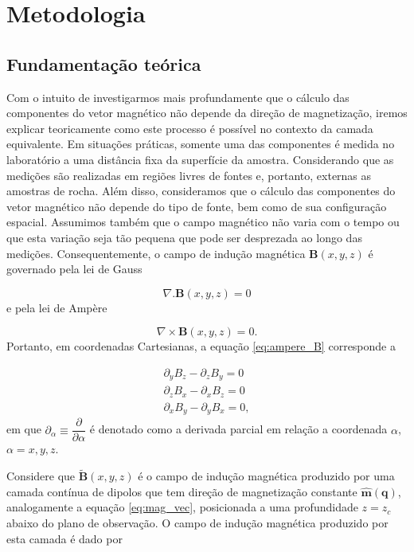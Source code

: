 \chapter{Metodologia}
\label{chap:metodolodia_part2}

\section{Fundamentação teórica}

Com o intuito de investigarmos mais profundamente que o cálculo das componentes do vetor magnético não depende da direção de magnetização, iremos explicar teoricamente como este processo é possível no contexto da camada equivalente. Em situações práticas, somente uma das componentes é medida no laboratório a uma distância fixa da superfície da amostra. Considerando que as medições são realizadas em regiões livres de fontes e, portanto, externas as amostras de rocha. Além disso, consideramos que o cálculo das componentes do vetor magnético não depende do tipo de fonte, bem como de sua configuração espacial. Assumimos também que o campo magnético não varia com o tempo ou que esta variação seja tão pequena que pode ser desprezada ao longo das medições. Consequentemente, o campo de indução magnética $\mathbf{B}(x,y,z)$ é governado pela lei de Gauss

\begin{equation}
\nabla . \mathbf{B} (x,y,z) = 0
\label{eq:gauss_B}
\end{equation}
e pela lei de Ampère 

\begin{equation}
\nabla \times \mathbf{B} (x,y,z) = 0.
\label{eq:ampere_B}
\end{equation}
Portanto, em coordenadas Cartesianas, a equação \ref{eq:ampere_B} corresponde a 

\begin{equation}
\begin{split}
\partial_y B_z - \partial_z B_y = 0 \\
\partial_z B_x - \partial_x B_z = 0 \\
\partial_x B_y - \partial_y B_x = 0, 
\end{split}
\label{eq:ampere_B_condicao}
\end{equation}
em que $\partial_\alpha \equiv \dfrac{\partial}{\partial \alpha}$ é denotado como a derivada parcial em relação a coordenada $\alpha$, $\alpha=x,y,z$. 

Considere que $\tilde{\mathbf{B}}(x,y,z)$ é o campo de indução magnética produzido por uma camada contínua de dipolos que tem direção de magnetização constante $\hat{\mathbf{m}} (\mathbf{q})$, analogamente a equação \ref{eq:mag_vec}, posicionada a uma profundidade $z=z_c$ abaixo do plano de observação. O campo de indução magnética produzido por esta camada é dado por 

